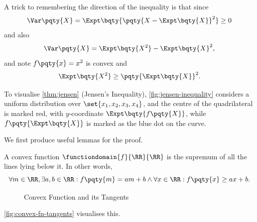 A trick to remembering the direction of the inequality is that since
\[
    \Var\pqty{X} = \Expt\bqty{\pqty{X - \Expt\bqty{X}}^2} \geq 0
\]
and also
\[
    \Var\pqty{X} = \Expt\bqty{X^2} - \Expt\bqty{X}^2,
\]
and note \(f\pqty{x} = x^2\) is convex and
\[
    \Expt\bqty{X^2} \geq \pqty{\Expt\bqty{X}}^2.
\]

To visualise \autoref{thm:jensen} (Jensen's Inequality), \autoref{fig:jensen-inequality} considers a uniform distribution over \(\set{x_1, x_2, x_3, x_4}\), and the centre of the quadrilateral is marked red, with \(y\)-coordinate \(\Expt\bqty{f\pqty{X}}\), while \(f\pqty{\Expt\bqty{X}}\) is marked as the blue dot on the curve.

We first produce useful lemmas for the proof.

\begin{lemma}
    \label{lem:convex-fn-tangents}%
    A convex function \(\functiondomain{f}{\RR}{\RR}\) is the supremum of all the lines lying below it. In other words,
    \[
        \forall m \in \RR, \exists a, b \in \RR: f\pqty{m} = am + b \land \forall x \in \RR: f\pqty{x} \geq ax + b.
    \]
\end{lemma}

\begin{figure}[ht!]
    \centering

    \caption{Convex Function and its Tangents}
    \label{fig:convex-fn-tangents}
\end{figure}

\autoref{fig:convex-fn-tangents} visualises this.

